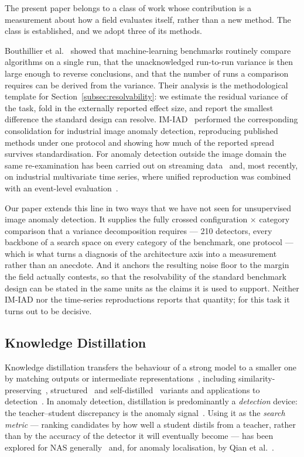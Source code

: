 The present paper belongs to a class of work whose contribution is a measurement
about how a field evaluates itself, rather than a new method. The class is
established, and we adopt three of its methods.

Bouthillier et al.~\cite{bouthillier2021accounting} showed that machine-learning
benchmarks routinely compare algorithms on a single run, that the unacknowledged
run-to-run variance is then large enough to reverse conclusions, and that the
number of runs a comparison requires can be derived from the variance. Their
analysis is the methodological template for
Section~\ref{subsec:resolvability}: we estimate the residual variance of the task,
fold in the externally reported effect size, and report the smallest difference
the standard design can resolve. IM-IAD~\cite{xie2024imiad} performed the
corresponding consolidation for industrial image anomaly detection, reproducing
published methods under one protocol and showing how much of the reported spread
survives standardisation. For anomaly detection outside the image domain the same
re-examination has been carried out on streaming
data~\cite{cao2024revisiting} and, most recently, on industrial multivariate time
series, where unified reproduction was combined with an event-level
evaluation~\cite{yu2026eventlevel}.

Our paper extends this line in two ways that we have not seen for unsupervised
image anomaly detection. It supplies the fully crossed configuration $\times$
category comparison that a variance decomposition requires --- 210 detectors,
every backbone of a search space on every category of the benchmark, one protocol
--- which is what turns a diagnosis of the architecture axis into a measurement
rather than an anecdote. And it anchors the resulting noise floor to the margin
the field actually contests, so that the resolvability of the standard benchmark
design can be stated in the same units as the claims it is used to support.
Neither IM-IAD nor the time-series reproductions reports that quantity; for this
task it turns out to be decisive.

\subsection{Knowledge Distillation}
\label{subsec:related_kd}

Knowledge distillation transfers the behaviour of a strong model to a smaller one
by matching outputs or intermediate representations~\cite{gou2021knowledge},
including similarity-preserving~\cite{tung2019similarity}, structured~\cite{liu2019structured}
and self-distilled~\cite{zhang2022self} variants and applications to
detection~\cite{wang2022distilling,yang2023attention}. In anomaly detection,
distillation is predominantly a \emph{detection} device: the teacher--student
discrepancy is the anomaly
signal~\cite{wang2021stpm,deng2022reverse,bergmann2020uninformed}. Using it as the
\emph{search metric} --- ranking candidates by how well a student distils from a
teacher, rather than by the accuracy of the detector it will eventually become ---
has been explored for NAS generally~\cite{kang2020towards} and, for anomaly
localisation, by Qian et al.~\cite{qian2024knowledgeguided}.

